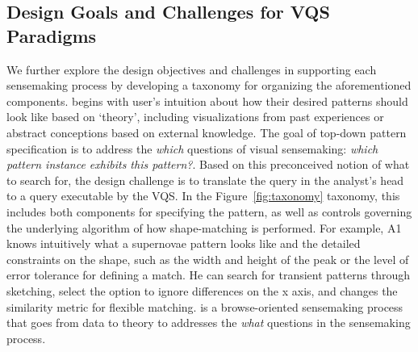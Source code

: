 \subsection{Design Goals and Challenges for VQS Paradigms}
We further explore the design objectives and challenges in supporting each sensemaking process by developing a taxonomy for organizing the aforementioned components.%
 begins with user's intuition about how their desired patterns should look like based on `theory', including visualizations from past experiences or abstract conceptions based on external knowledge. The goal of top-down pattern specification is to address the \textit{which} questions of visual sensemaking: \textit{which pattern instance exhibits this pattern?}.%
Based on this preconceived notion of what to search for, the design challenge is to translate the query in the analyst's head to a query executable by the VQS. In the Figure~\ref{fig:taxonomy} taxonomy, this includes both components for specifying the pattern, as well as controls governing the underlying algorithm of how shape-matching is performed. For example, A1 knows intuitively what a supernovae pattern looks like and the detailed constraints on the shape, such as the width and height of the peak or the level of error tolerance for defining a match. He can search for transient patterns through sketching, select the option to ignore differences on the x axis, and changes the similarity metric for flexible matching.  %
 is a browse-oriented sensemaking process that goes from data to theory to addresses the \textit{what} questions in the sensemaking process.
